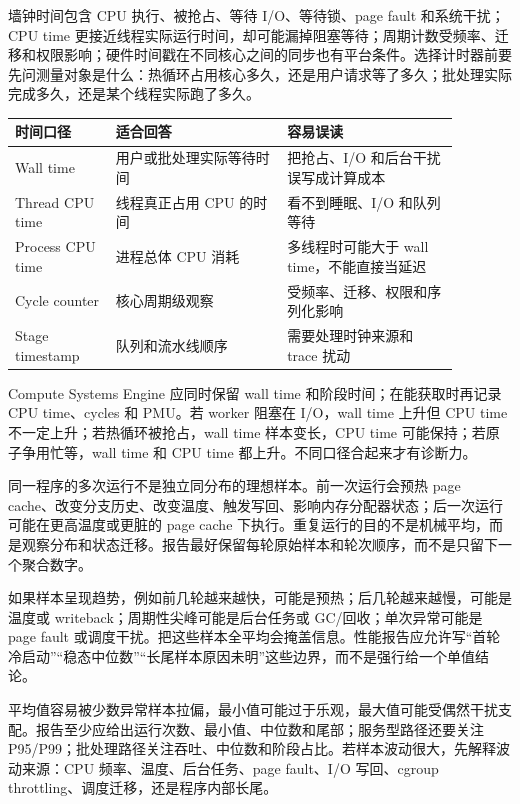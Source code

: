 墙钟时间包含 CPU 执行、被抢占、等待 I/O、等待锁、page fault 和系统干扰；CPU time 更接近线程实际运行时间，却可能漏掉阻塞等待；周期计数受频率、迁移和权限影响；硬件时间戳在不同核心之间的同步也有平台条件。选择计时器前要先问测量对象是什么：热循环占用核心多久，还是用户请求等了多久；批处理实际完成多久，还是某个线程实际跑了多久。

\begin{center}
\small
\begin{tabular}{@{}p{0.20\linewidth}p{0.34\linewidth}p{0.34\linewidth}@{}}
\toprule
时间口径 & 适合回答 & 容易误读 \\
\midrule
Wall time & 用户或批处理实际等待时间 & 把抢占、I/O 和后台干扰误写成计算成本 \\
Thread CPU time & 线程真正占用 CPU 的时间 & 看不到睡眠、I/O 和队列等待 \\
Process CPU time & 进程总体 CPU 消耗 & 多线程时可能大于 wall time，不能直接当延迟 \\
Cycle counter & 核心周期级观察 & 受频率、迁移、权限和序列化影响 \\
Stage timestamp & 队列和流水线顺序 & 需要处理时钟来源和 trace 扰动 \\
\bottomrule
\end{tabular}
\end{center}

Compute Systems Engine 应同时保留 wall time 和阶段时间；在能获取时再记录 CPU time、cycles 和 PMU。若 worker 阻塞在 I/O，wall time 上升但 CPU time 不一定上升；若热循环被抢占，wall time 样本变长，CPU time 可能保持；若原子争用忙等，wall time 和 CPU time 都上升。不同口径合起来才有诊断力。

同一程序的多次运行不是独立同分布的理想样本。前一次运行会预热 page cache、改变分支历史、改变温度、触发写回、影响内存分配器状态；后一次运行可能在更高温度或更脏的 page cache 下执行。重复运行的目的不是机械平均，而是观察分布和状态迁移。报告最好保留每轮原始样本和轮次顺序，而不是只留下一个聚合数字。

如果样本呈现趋势，例如前几轮越来越快，可能是预热；后几轮越来越慢，可能是温度或 writeback；周期性尖峰可能是后台任务或 GC/回收；单次异常可能是 page fault 或调度干扰。把这些样本全平均会掩盖信息。性能报告应允许写“首轮冷启动”“稳态中位数”“长尾样本原因未明”这些边界，而不是强行给一个单值结论。

平均值容易被少数异常样本拉偏，最小值可能过于乐观，最大值可能受偶然干扰支配。报告至少应给出运行次数、最小值、中位数和尾部；服务型路径还要关注 P95/P99；批处理路径关注吞吐、中位数和阶段占比。若样本波动很大，先解释波动来源：CPU 频率、温度、后台任务、page fault、I/O 写回、cgroup throttling、调度迁移，还是程序内部长尾。


